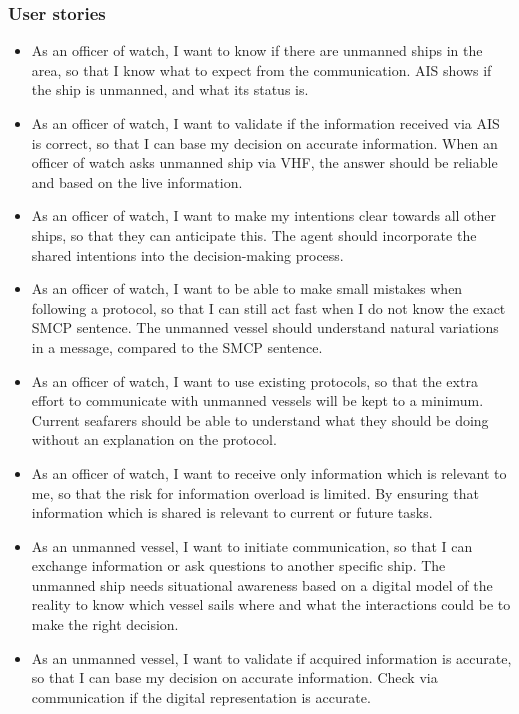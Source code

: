 \subsubsection{User stories}
\begin{itemize}
	\item As an officer of watch, I want to know if there are unmanned ships in the area, so that I know what to expect from the communication. \ac{AIS} shows if the ship is unmanned, and what its status is.
	
	\item As an officer of watch, I want to validate if the information received via \ac{AIS} is correct, so that I can base my decision on accurate information. When an officer of watch asks unmanned ship via \ac{VHF}, the answer should be reliable and based on the live information.
	
	\item As an officer of watch, I want to make my intentions clear towards all other ships, so that they can anticipate this. The agent should incorporate the shared intentions into the decision-making process.
	
	\item As an officer of watch, I want to be able to make small mistakes when following a protocol, so that I can still act fast when I do not know the exact \ac{SMCP} sentence. The unmanned vessel should understand natural variations in a message, compared to the \ac{SMCP} sentence.
\newpage
	\item As an officer of watch, I want to use existing protocols, so that the extra effort to communicate with unmanned vessels will be kept to a minimum. Current seafarers should be able to understand what they should be doing without an explanation on the protocol. 
	
	\item As an officer of watch, I want to receive only information which is relevant to me, so that the risk for information overload is limited. By ensuring that information which is shared is relevant to current or future tasks.
	
	\item As an unmanned vessel, I want to initiate communication, so that I can exchange information or ask questions to another specific ship. The unmanned ship needs situational awareness based on a digital model of the reality to know which vessel sails where and what the interactions could be to make the right decision.
	
	\item As an unmanned vessel, I want to validate if acquired information is accurate, so that I can base my decision on accurate information. Check via communication if the digital representation is accurate.
	

\end{itemize}
